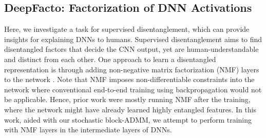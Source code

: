    
   



\subsection{DeepFacto: Factorization of DNN Activations }\label{sec:deepfacto}

Here, we investigate a task for supervised disentanglement, which can provide insights for explaining DNNs to humans. Supervised disentanglement aims to find disentangled factors that decide the CNN output, yet are human-understandable and distinct from each other. One approach to learn a disentangled representation is through adding  non-negative matrix factorization (NMF)\cite{lee1999learning} layers to the network \cite{collins2018deep}. Note that NMF imposes non-differentiable constraints into the network where conventional end-to-end training using backpropagation would not be applicable. Hence, prior work were mostly running NMF after the training, where the network might have already learned highly entangled features. In this work, aided with our stochastic block-ADMM, we attempt to perform training with NMF layers in the intermediate layers of DNNs.

